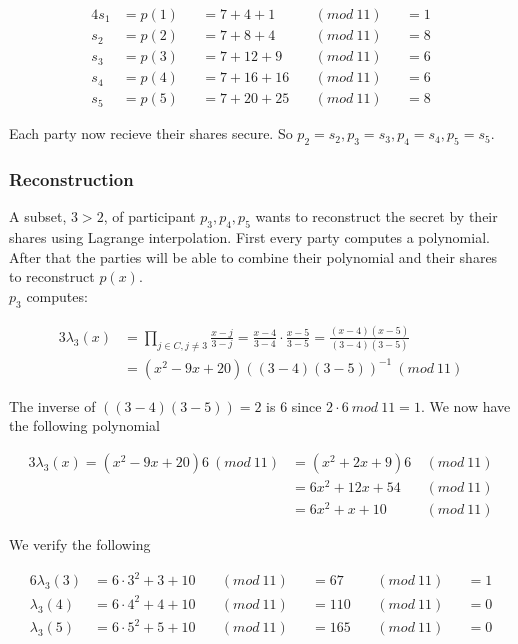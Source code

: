 \noindent
\begin{alignat*}{4}
s_1&=p(1)&&= 7+4+1 \ &&(mod \ 11) &&=1 \\
s_2&=p(2)&&= 7+8+4 \ &&(mod \ 11) &&=8 \\
s_3&=p(3)&&= 7+12+9 \ &&(mod \ 11) &&=6 \\
s_4&=p(4)&&= 7+16+16 \ &&(mod \ 11) &&=6 \\
s_5&=p(5)&&= 7+20+25 \ &&(mod \ 11) &&=8    
\end{alignat*}


\noindent
Each party now recieve their shares secure. So $p_2= s_2, p_3=s_3, p_4= s_4, p_5= s_5$.

\subsubsection{Reconstruction}
A subset, $3>2$, of participant $p_3, p_4, p_5$ wants to reconstruct the secret by their shares using Lagrange interpolation. First every party computes a polynomial. After that the parties will be able to combine their polynomial and their shares to reconstruct $p(x)$.\\

\noindent
$p_3$ computes:


\noindent
\begin{alignat*}{3}
\lambda_3(x)&=\prod\limits_{j\in C,j\neq3} \frac{x-j}{3-j} = \frac{x-4}{3-4} \cdot \frac{x-5}{3-5} =\frac{(x-4)(x-5)}{(3-4)(3-5)}  \\
&= (x^2-9x+20)((3-4)(3-5))^{-1} \ (mod \ 11)
\end{alignat*}

\noindent
The inverse of  $((3-4)(3-5))= 2$ is $6$ since $2 \cdot 6 \ mod \ 11 = 1$. We now have the following polynomial

\noindent
\begin{alignat*}{3}
\lambda_3(x) = (x^2-9x+20)6 \ (mod \ 11) &= (x^2 + 2x+9)6 \ &(mod \ 11) \\
&= 6x^2 + 12x + 54 \ &(mod \ 11) \\
&= 6x^2+x+ 10 \ &(mod \ 11) 
\end{alignat*}

\noindent
We verify the following


\noindent
\begin{alignat*}{6}
\lambda_3(3) &=  6 \cdot 3^2+3+ 10  \ &&(mod \ 11) &&= 67 \ &&(mod \ 11) &&= 1 \\
\lambda_3(4) &=  6 \cdot 4^2+4+ 10  \ &&(mod \ 11) &&= 110 \ &&(mod \ 11) &&= 0 \\
\lambda_3(5) &=  6 \cdot 5^2+5+ 10  \ &&(mod \ 11) &&= 165 \ &&(mod \ 11) &&= 0
\end{alignat*}

